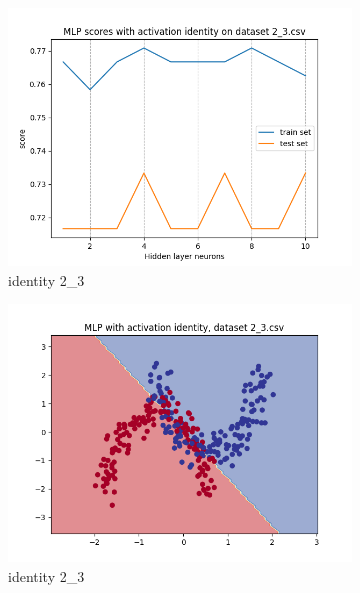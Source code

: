 \documentclass[12pt]{article}
\newcommand*{\subfigwidth}{0.24\textwidth}
\begin{document}
\begin{figure}[H]
\begin{subfigure}[t]{\subfigwidth}
        \includegraphics[width=\linewidth]{img/exp_1/mlp/2_3/identity/scores.png}
        \caption{identity 2\_3}
    \end{subfigure}
    \hfill
    \begin{subfigure}[t]{\subfigwidth}
        \includegraphics[width=\linewidth]{img/exp_1/mlp/2_3/identity/boundary.png}
        \caption{identity 2\_3}
    \end{subfigure}
    \hfill
    \begin{subfigure}[t]{\subfigwidth}

\end{subfigure}
\end{figure}
\end{document}
